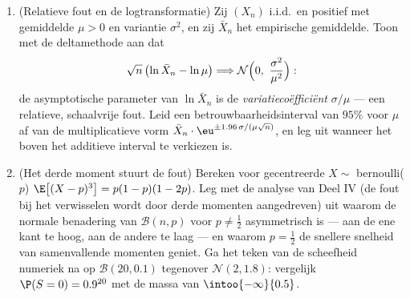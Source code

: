 \begin{problem}
\begin{enumerate}[resume]
  \item (Relatieve fout en de logtransformatie) Zij $(X_n)$
        i.i.d.\ en positief met gemiddelde $\mu > 0$ en variantie
        $\sigma^2$, en zij $\bar X_n$ het empirische gemiddelde.
        Toon met de deltamethode aan dat
        \[
        \sqrt n\,\bigl(\ln\bar X_n - \ln\mu\bigr)
        \Longrightarrow
        \mathcal N\Bigl(0,\ \frac{\sigma^2}{\mu^2}\Bigr) :
        \]
        de asymptotische parameter van $\ln\bar X_n$ is de
        \emph{variatiecoëfficiënt} $\sigma/\mu$ --- een
        relatieve, schaalvrije fout. Leid een
        betrouwbaarheidsinterval van $95\%$ voor $\mu$ af van de
        multiplicatieve vorm $\bar
        X_n\cdot\eu^{\pm1.96\,\sigma/(\mu\sqrt n)}$, en leg uit
        wanneer het boven het additieve interval te verkiezen
        is.
  \item (Het derde moment stuurt de fout) Bereken voor
        gecentreerde $X \sim$ bernoulli($p$) $\E\bigl[(X -
        p)^3\bigr] = p(1-p)(1-2p)$. Leg met de analyse van Deel
        IV (de fout bij het verwisselen wordt door derde momenten
        aangedreven) uit waarom de normale benadering van
        $\mathcal B(n, p)$ voor $p \neq \frac12$ asymmetrisch is
        --- aan de ene kant te hoog, aan de andere te laag ---
        en waarom $p = \frac12$ de snellere snelheid van
        samenvallende momenten geniet. Ga het teken van de
        scheefheid numeriek na op $\mathcal B(20, 0.1)$ tegenover
        $\mathcal N(2, 1.8)$: vergelijk $\P(S = 0) = 0.9^{20}$
        met de  massa van $\intoo{-\infty}{0.5}$.
\end{enumerate}
\end{problem}
